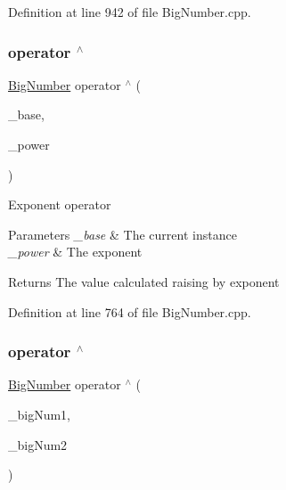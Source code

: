 Definition at line 942 of file Big\+Number.\+cpp.

\mbox{\label{class_big_nums_1_1_big_number_a0f9a8bcbc50de75e11d114a8c8629896}} 
\subsubsection{\texorpdfstring{operator $^\wedge$}{operator ^}\hspace{0.1cm}{\footnotesize\ttfamily [1/2]}}
{\footnotesize\ttfamily \mbox{\hyperlink{class_big_nums_1_1_big_number}{Big\+Number}} operator $^\wedge$ (\begin{DoxyParamCaption}\item[{\mbox{\hyperlink{class_big_nums_1_1_big_number}{Big\+Number}}}]{\+\_\+base,  }\item[{int}]{\+\_\+power }\end{DoxyParamCaption})\hspace{0.3cm}{\ttfamily [friend]}}

Exponent operator 
\begin{DoxyParams}{Parameters}
{\em \+\_\+base} & The current instance \\
\hline
{\em \+\_\+power} & The exponent \\
\hline
\end{DoxyParams}
\begin{DoxyReturn}{Returns}
The value calculated raising by exponent 
\end{DoxyReturn}


Definition at line 764 of file Big\+Number.\+cpp.

\mbox{\label{class_big_nums_1_1_big_number_a2e3512db297a67899d84f57ba0ec31f5}} 
\subsubsection{\texorpdfstring{operator $^\wedge$}{operator ^}\hspace{0.1cm}{\footnotesize\ttfamily [2/2]}}
{\footnotesize\ttfamily \mbox{\hyperlink{class_big_nums_1_1_big_number}{Big\+Number}} operator $^\wedge$ (\begin{DoxyParamCaption}\item[{const \mbox{\hyperlink{class_big_nums_1_1_big_number}{Big\+Number}} \&}]{\+\_\+big\+Num1,  }\item[{const \mbox{\hyperlink{class_big_nums_1_1_big_number}{Big\+Number}} \&}]{\+\_\+big\+Num2 }\end{DoxyParamCaption})\hspace{0.3cm}{\ttfamily [friend]}}

